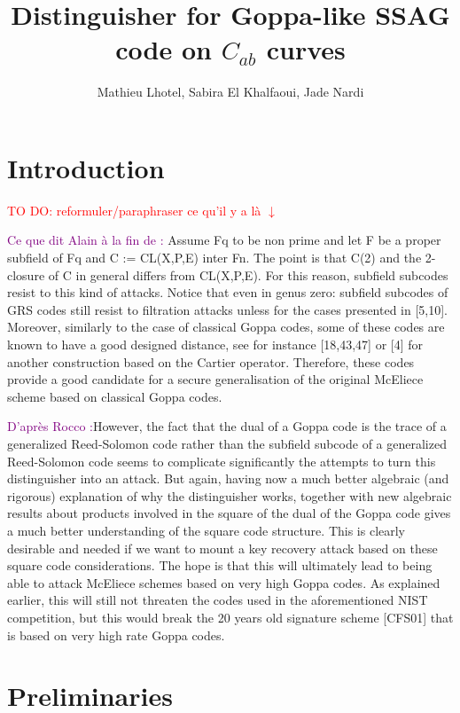 \documentclass[a4paper]{article}
\title{Distinguisher for Goppa-like SSAG code on $C_{ab}$ curves}
\author{Mathieu Lhotel, Sabira El Khalfaoui, Jade Nardi}
\date{}
\theoremstyle{definition}
\theoremstyle{remark}
\newcommand\jade[1]{\textcolor{purple}{#1}}
\newcommand\TODO[1]{\textcolor{red}{TO DO: #1}}
\begin{document}
\maketitle

\section{Introduction}

\TODO{reformuler/paraphraser ce qu'il y a là $\downarrow$}

\jade{Ce que dit Alain à la fin de \cite{CMR17} :} 
Assume Fq to be non prime and let F be a proper subfield of Fq and C := CL(X,P,E) inter Fn. The point is that C(2) and the 2-closure of C in general differs from CL(X,P,E). For this reason, subfield subcodes resist to this kind of attacks. Notice that even
in genus zero: subfield subcodes of GRS codes still resist to filtration attacks unless for the cases presented in [5,10]. Moreover, similarly to the case of classical Goppa codes, some of these codes are known to have a good designed distance, see for instance [18,43,47] or [4] for another construction based on the Cartier operator. Therefore, these codes provide a good candidate for a secure generalisation of the original McEliece scheme based on classical Goppa codes.

\jade{D'après Rocco \cite{MT21} :}However, the fact that the dual of a Goppa code is the trace of a generalized Reed-Solomon code rather than the subfield subcode of a generalized Reed-Solomon code seems to complicate significantly the attempts to turn this distinguisher into an attack. But again, having now a much better algebraic (and rigorous) explanation of why the distinguisher works, together with new
algebraic results about products involved in the square of the dual of the Goppa code gives a much better understanding of the square code structure. This is clearly desirable and needed if we want to mount a key recovery attack based on these square code considerations. The hope is that this will ultimately lead to being able to attack McEliece schemes based on very high Goppa codes. As explained earlier, this will still not threaten the codes used in the aforementioned NIST competition, but this would break the 20 years old signature scheme [CFS01] that is based on very high rate Goppa codes.

\section{Preliminaries}
\end{document}
